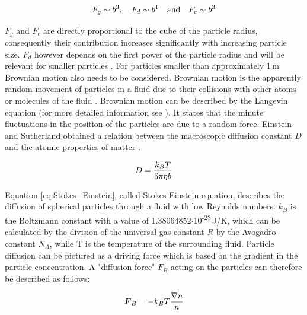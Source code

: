 \begin{equation}
\label{eq:force_rad}
\centering
F_{g}\sim b^{3}, \quad F_{d}\sim b^{1} \quad \textrm{and} \quad F_{c}\sim b^{3}
\end{equation}

$F_{g}$ and $F_{c}$ are directly proportional to the cube of the particle radius, consequently their contribution increases significantly with increasing particle size. $F_{d}$ however depends on the first power of the particle radius and will be relevant for smaller particles \cite{svoboda2004magnetic}\cite{oberteuffer1974magnetic}. For particles smaller than approximately 1\,\textmu m Brownian motion also needs to be considered. Brownian motion is the apparently random movement of particles in a fluid due to their collisions with other atoms or molecules of the fluid \cite{brown1828xxvii}. Brownian motion can be described by the   
Langevin equation (for more detailed information see \cite{Langevin}\cite{BrownianDynamics} \cite{BrownianModel}). It states that the minute fluctuations in the position of the particles are due to a random force. Einstein and Sutherland obtained a relation between the macroscopic diffusion constant $D$ and the atomic properties of matter \cite{einstein1906theorie}\cite{einstein1905molekularkinetischen}\cite{sutherland1905lxxv}. 

\begin{equation}
\label{eq:Stokes_Einstein}
\centering
D = \frac{k_{B}T}{6\pi\eta b}
\end{equation}

Equation \ref{eq:Stokes_Einstein}, called Stokes-Einstein equation, describes the diffusion of spherical particles through a fluid with low Reynolds numbers. $k_{B}$ is the Boltzmann constant with a value of 1.38064852$\cdotp$10\textsuperscript{-23}\,J/K, which can be calculated by the division of the universal gas constant $R$ by the Avogadro constant $N_{A}$, while T is the temperature of the surrounding fluid. Particle diffusion can be pictured as a driving force which is based on the gradient in the particle concentration. 
A "diffusion force" $F_{B}$ acting on the particles can therefore be described as follows:

\begin{equation}
\label{eq:mag_force}
\centering
\boldsymbol{F}_{B} = -k_{B}T\frac{\nabla n}{n}
\end{equation}

